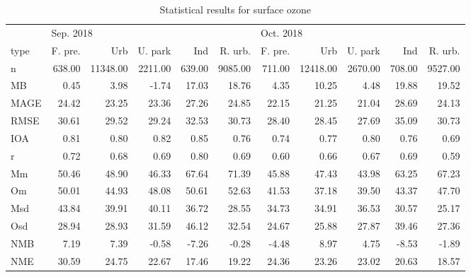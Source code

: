 \begin{table}
\centering
\caption{Statistical results for surface ozone}
\label{tab: o3_sta}
\begin{tabular}{lrrrrrrrrrr}
\toprule
{} & \multicolumn{5}{l}{Sep. 2018} & \multicolumn{5}{l}{Oct. 2018} \\
type &   F. pre. &       Urb &  U. park &     Ind &  R. urb. &   F. pre. &       Urb &  U. park &     Ind &  R. urb. \\
\midrule
n    &    638.00 &  11348.00 &  2211.00 &  639.00 &  9085.00 &    711.00 &  12418.00 &  2670.00 &  708.00 &  9527.00 \\
MB   &      0.45 &      3.98 &    -1.74 &   17.03 &    18.76 &      4.35 &     10.25 &     4.48 &   19.88 &    19.52 \\
MAGE &     24.42 &     23.25 &    23.36 &   27.26 &    24.85 &     22.15 &     21.25 &    21.04 &   28.69 &    24.13 \\
RMSE &     30.61 &     29.52 &    29.24 &   32.53 &    30.73 &     28.40 &     28.45 &    27.69 &   35.09 &    30.73 \\
IOA  &      0.81 &      0.80 &     0.82 &    0.85 &     0.76 &      0.74 &      0.77 &     0.80 &    0.76 &     0.69 \\
r    &      0.72 &      0.68 &     0.69 &    0.80 &     0.69 &      0.60 &      0.66 &     0.67 &    0.69 &     0.59 \\
Mm   &     50.46 &     48.90 &    46.33 &   67.64 &    71.39 &     45.88 &     47.43 &    43.98 &   63.25 &    67.23 \\
Om   &     50.01 &     44.93 &    48.08 &   50.61 &    52.63 &     41.53 &     37.18 &    39.50 &   43.37 &    47.70 \\
Msd  &     43.84 &     39.91 &    40.11 &   36.72 &    28.55 &     34.73 &     34.91 &    36.53 &   30.57 &    25.17 \\
Osd  &     28.94 &     28.93 &    31.59 &   46.12 &    32.54 &     24.67 &     25.88 &    27.87 &   39.46 &    27.36 \\
NMB  &      7.19 &      7.39 &    -0.58 &   -7.26 &    -0.28 &     -4.48 &      8.97 &     4.75 &   -8.53 &    -1.89 \\
NME  &     30.59 &     24.75 &    22.67 &   17.46 &    19.22 &     24.36 &     23.26 &    23.02 &   20.63 &    18.57 \\
\bottomrule
\end{tabular}
\end{table}

